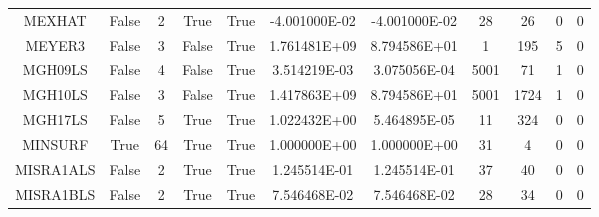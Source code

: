 \begin{longtable}{ccccccccccc}
	\cellcolor{default2} MEXHAT& \cellcolor{default2} False& \cellcolor{default2} 2& \cellcolor{default2} True& \cellcolor{default2} True& \cellcolor{best} -4.001000E-02& \cellcolor{best} -4.001000E-02& \cellcolor{ok} 28& \cellcolor{best} 26& \cellcolor{default2} 0& \cellcolor{default2} 0\\
	\cellcolor{default1} MEYER3& \cellcolor{default1} False& \cellcolor{default1} 3& \cellcolor{default1} False& \cellcolor{default1} True& \cellcolor{poor} 1.761481E+09& \cellcolor{best} 8.794586E+01& \cellcolor{best} 1& \cellcolor{poor} 195& \cellcolor{default1} 5& \cellcolor{default1} 0\\
	\cellcolor{default2} MGH09LS& \cellcolor{default2} False& \cellcolor{default2} 4& \cellcolor{default2} False& \cellcolor{default2} True& \cellcolor{poor} 3.514219E-03& \cellcolor{best} 3.075056E-04& \cellcolor{poor} 5001& \cellcolor{best} 71& \cellcolor{default2} 1& \cellcolor{default2} 0\\
	\cellcolor{default1} MGH10LS& \cellcolor{default1} False& \cellcolor{default1} 3& \cellcolor{default1} False& \cellcolor{default1} True& \cellcolor{poor} 1.417863E+09& \cellcolor{best} 8.794586E+01& \cellcolor{poor} 5001& \cellcolor{best} 1724& \cellcolor{default1} 1& \cellcolor{default1} 0\\
	\cellcolor{default2} MGH17LS& \cellcolor{default2} False& \cellcolor{default2} 5& \cellcolor{default2} True& \cellcolor{default2} True& \cellcolor{poor} 1.022432E+00& \cellcolor{best} 5.464895E-05& \cellcolor{best} 11& \cellcolor{poor} 324& \cellcolor{default2} 0& \cellcolor{default2} 0\\
	\cellcolor{default1} MINSURF& \cellcolor{default1} True& \cellcolor{default1} 64& \cellcolor{default1} True& \cellcolor{default1} True& \cellcolor{ok} 1.000000E+00& \cellcolor{best} 1.000000E+00& \cellcolor{poor} 31& \cellcolor{best} 4& \cellcolor{default1} 0& \cellcolor{default1} 0\\
	\cellcolor{default2} MISRA1ALS& \cellcolor{default2} False& \cellcolor{default2} 2& \cellcolor{default2} True& \cellcolor{default2} True& \cellcolor{best} 1.245514E-01& \cellcolor{ok} 1.245514E-01& \cellcolor{best} 37& \cellcolor{ok} 40& \cellcolor{default2} 0& \cellcolor{default2} 0\\
	\cellcolor{default1} MISRA1BLS& \cellcolor{default1} False& \cellcolor{default1} 2& \cellcolor{default1} True& \cellcolor{default1} True& \cellcolor{ok} 7.546468E-02& \cellcolor{best} 7.546468E-02& \cellcolor{best} 28& \cellcolor{ok} 34& \cellcolor{default1} 0& \cellcolor{default1} 0\\

\end{longtable}
